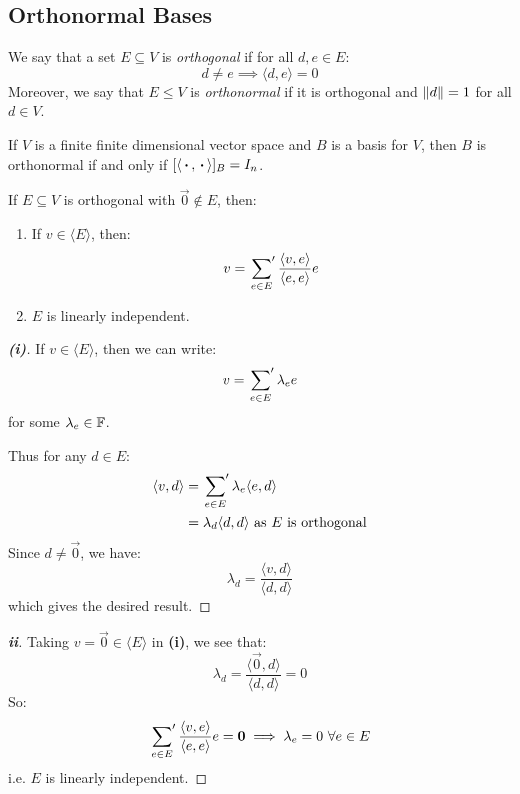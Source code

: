 \documentclass[../main.tex]{subfiles}
\begin{document}
\subsection{Orthonormal Bases}
\begin{definition}
  We say that a set $E \subseteq V$ is \textit{orthogonal} if for all $d, e \in E$:
  \[
    d \neq e \implies \langle d, e \rangle = 0
  \]
  Moreover, we say that $E \leq V$ is \textit{orthonormal} if it is orthogonal and $\left\lVert d \right\rVert = 1$ for all $d \in V$.
\end{definition}
\begin{remark}
  If $V$ is a finite finite dimensional vector space and $B$ is a basis for $V$, then $B$ is orthonormal if and only if $[\langle {\hspace{0.18em}\boldsymbol{\cdot}\hspace{0.18em}}, {\hspace{0.18em}\boldsymbol{\cdot}\hspace{0.18em}} \rangle]_{B} = I_n$.
\end{remark}
\begin{lemma}
  If $E \subseteq V$ is orthogonal with $\vec{0} \notin E$, then: \label{vExpr}
  \begin{enumerate}
    \item If $v \in \langle E \rangle$, then:
      \[
        v = \sideset{}{'}\sum_{e \in E} \frac{\langle v, e \rangle}{\langle e, e \rangle}e
      \]
    \item $E$ is linearly independent.
  \end{enumerate}
\end{lemma}
\begin{proof}[\textbf{(i)}]

  If $v \in \langle E \rangle$, then we can write:
  \[
    v = \sideset{}{'}\sum_{e \in E} \lambda_e e
  \]
  for some $\lambda_e \in \mathbb{F}$.

  Thus for any $d \in E$:
  \begin{align*}
    \langle v, d \rangle &= \sideset{}{'}\sum_{e \in E} \lambda_e \langle e, d \rangle \\
                         &= \lambda_d \langle d, d \rangle \text{ as $E$ is orthogonal}
  \end{align*}
  Since $d \neq \vec{0}$, we have:
  \[
    \lambda_d = \frac{\langle v, d \rangle}{\langle d, d \rangle}
  \]
  which gives the desired result.
\end{proof}
\begin{proof}[\textbf{ii}]
  Taking $v = \vec{0} \in \langle E \rangle$ in \textbf{(i)}, we see that:
  \[
    \lambda_d = \frac{\langle \vec{0}, d \rangle}{\langle d, d \rangle} = 0
  \]
  So:
  \[
    \finitesum_{e \in E} \frac{\langle v, e \rangle}{\langle e, e \rangle}e = \vec{0} \implies \lambda_e = 0\ \forall e \in E
  \]
  i.e. $E$ is linearly independent.
\end{proof}
\end{document}
